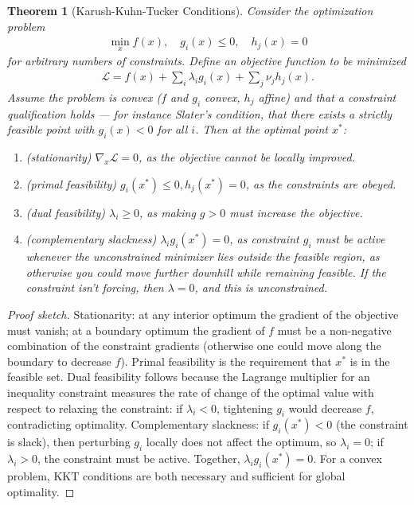 \documentclass[11pt]{article}
\theoremstyle{definition}
\theoremstyle{plain}
\newtheorem{theorem}{Theorem}[section]
\theoremstyle{remark}
\begin{document}
\begin{theorem}[Karush-Kuhn-Tucker Conditions]
    Consider the optimization problem
    \begin{align}
        \min_x f(x), \quad g_i(x) \leq 0, \quad h_j(x) = 0
    \end{align}
    for arbitrary numbers of constraints. Define an objective function to be minimized
    \begin{align}
        \mathcal{L} = f(x) + \sum_i \lambda_i g_i(x) + \sum_j \nu_jh_j(x).
    \end{align}
    Assume the problem is convex ($f$ and $g_i$ convex, $h_j$ affine) and that a constraint qualification holds --- for instance Slater's condition, that there exists a strictly feasible point with $g_i(x) < 0$ for all $i$. Then at the optimal point $x^*$:
    \begin{enumerate}
        \item (stationarity) $\nabla_x \mathcal{L} = 0$, as the objective cannot be locally improved.
        \item (primal feasibility) $g_i(x^*) \leq 0, h_j(x^*) = 0$, as the constraints are obeyed.
        \item (dual feasibility) $\lambda_i \geq  0$, as making $g>0$ must increase the objective.
        \item (complementary slackness) $\lambda_ig_i(x^*) = 0$, as constraint $g_i$ must be active whenever the unconstrained minimizer lies outside the feasible region, as otherwise you could move further downhill while remaining feasible. If the constraint isn't forcing, then $\lambda=0$, and this is unconstrained.
    \end{enumerate}
\end{theorem}
\begin{proof}[Proof sketch]
    Stationarity: at any interior optimum the gradient of the objective must vanish; at a boundary optimum the gradient of $f$ must be a non-negative combination of the constraint gradients (otherwise one could move along the boundary to decrease $f$). Primal feasibility is the requirement that $x^*$ is in the feasible set. Dual feasibility follows because the Lagrange multiplier for an inequality constraint measures the rate of change of the optimal value with respect to relaxing the constraint: if $\lambda_i < 0$, tightening $g_i$ would decrease $f$, contradicting optimality. Complementary slackness: if $g_i(x^*) < 0$ (the constraint is slack), then perturbing $g_i$ locally does not affect the optimum, so $\lambda_i = 0$; if $\lambda_i > 0$, the constraint must be active. Together, $\lambda_i g_i(x^*) = 0$. For a convex problem, KKT conditions are both necessary and sufficient for global optimality.
\end{proof}
\end{document}
